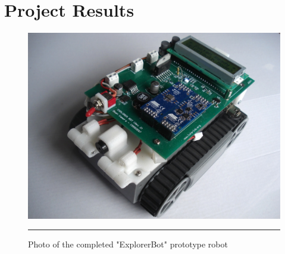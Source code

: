 \chapter{Project Results}
\label{Chapter 5}


\begin{figure}[H]
	\vspace{1em}
	\centering
		\includegraphics[width=140mm]{./Figures/CompletedRobot.jpg}
	\rule{35em}{0.5pt}
	\caption[Photo of Completed Robot]{Photo of the completed "ExplorerBot" prototype robot}
	\label{fig:completedrobot}
\end{figure}